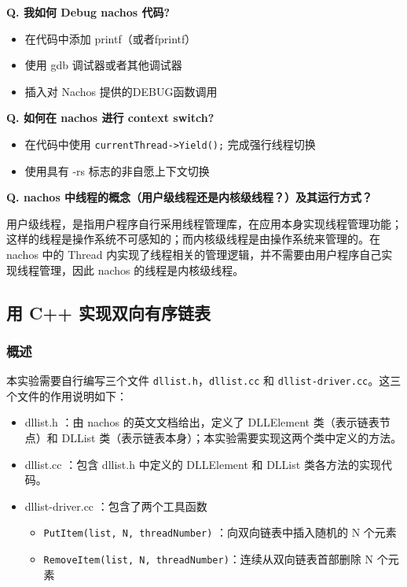 \documentclass[a4paper,12pt]{article}
\begin{document}
\par\textbf{Q.  我如何 Debug nachos 代码?}
\begin{itemize}
    \item  在代码中添加 printf（或者fprintf）
    \item 使用 gdb 调试器或者其他调试器
    \item 插入对 Nachos 提供的DEBUG函数调用
\end{itemize}

\par\textbf{Q. 如何在 nachos 进行 context switch? }
\begin{itemize}
    \item 在代码中使用 \texttt{currentThread->Yield();} 完成强行线程切换
    \item 使用具有 -rs 标志的非自愿上下文切换
\end{itemize}

\par\textbf{Q. nachos 中线程的概念（用户级线程还是内核级线程？）及其运行方式？}
\par 用户级线程，是指用户程序自行采用线程管理库，在应用本身实现线程管理功能；这样的线程是操作系统不可感知的；而内核级线程是由操作系统来管理的。在 nachos 中的 Thread 内实现了线程相关的管理逻辑，并不需要由用户程序自己实现线程管理，因此 nachos 的线程是内核级线程。

\subsection{用 C++ 实现双向有序链表}

\subsubsection{概述}

\par 本实验需要自行编写三个文件 \texttt{dllist.h}，\texttt{dllist.cc} 和 \texttt{dllist-driver.cc}。这三个文件的作用说明如下：
\begin{itemize}
    \item dllist.h ：由 nachos 的英文文档给出，定义了 DLLElement 类（表示链表节点）和 DLList 类（表示链表本身）；本实验需要实现这两个类中定义的方法。
    \item dllist.cc ：包含 dllist.h 中定义的 DLLElement 和 DLList 类各方法的实现代码。
    \item dllist-driver.cc ：包含了两个工具函数 
    \begin{itemize}
        \item \texttt{PutItem(list, N, threadNumber)} ：向双向链表中插入随机的 N 个元素
        \item \texttt{RemoveItem(list, N, threadNumber)}：连续从双向链表首部删除 N 个元素
    \end{itemize}
\end{itemize}
\end{document}
